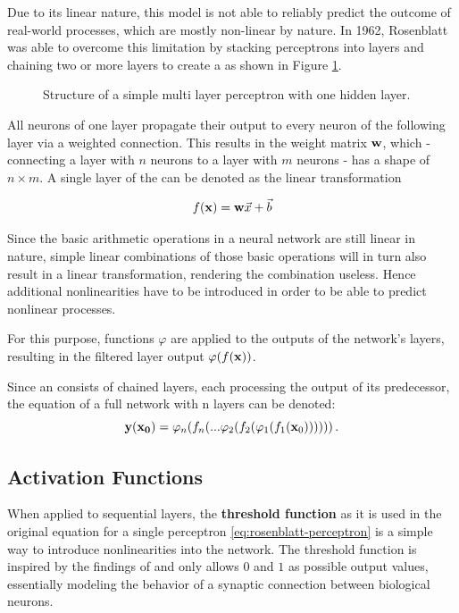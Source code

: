 	Due to its linear nature, this model is not able to reliably predict the outcome of real-world processes, which are mostly non-linear by nature. In 1962, Rosenblatt was able to overcome this limitation by stacking perceptrons into layers and chaining two or more layers to create a  \cite{ROSENBLATT1961} as shown in Figure \ref{fig:mlp}. 
	
	\begin{figure}
		
		\centering
		\caption{Structure of a simple multi layer perceptron with one hidden layer.}
		\label{fig:mlp}
	\end{figure}
	
	All neurons of one layer propagate their output to every neuron of the following layer via a weighted connection. This results in the weight matrix $\mathbf{w}$, which - connecting a layer with $n$ neurons to a layer with $m$ neurons - has a shape of $n\times m$. A single layer of the  can be denoted as the linear transformation
	
	\begin{equation}
		f(\mathbf{x}) = \mathbf{w}\vec{x} + \vec{b} 
	\end{equation}
	
	
	
	Since the basic arithmetic operations in a neural network are still linear in nature, simple linear combinations of those basic operations will in turn also result in a linear transformation, rendering the combination useless. Hence additional nonlinearities have to be introduced in order to be able to predict nonlinear processes. 
	
	For this purpose, functions $\varphi$ are applied to the outputs of the network's layers, resulting in the filtered layer output $\varphi(f(\mathbf{x}))$.
	
	Since an  consists of chained layers, each processing the output of its predecessor, the equation of a full network with n layers can be denoted:
	\begin{equation}
		\mathbf{y}(\mathbf{x_0}) = \varphi_n(f_n(... \varphi_2(f_2(\varphi_1(f_1(\mathbf{x}_0)))))) \,.
	\end{equation}
	
	\subsection{Activation Functions}
	
		When applied to sequential layers, the \textbf{threshold function} as it is used in the original equation for a single perceptron \ref{eq:rosenblatt-perceptron} is a simple way to introduce nonlinearities into the network. The threshold function is inspired by the findings of \cite{McCulloch1943} and only allows $0$ and $1$ as possible output values, essentially modeling the behavior of a synaptic connection between biological neurons. 
		
